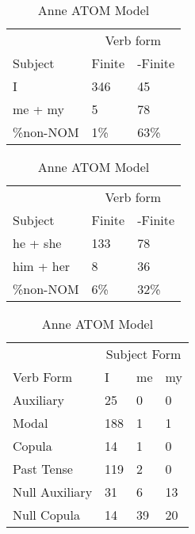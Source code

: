 \begin{table}[]
    \caption{Anne ATOM Model}
\begin{minipage}{0.5\textwidth}
    \centering
    \begin{tabular}{@{}lll@{}}
        \toprule
         &\multicolumn{2}{c}{Verb form}\\
         \cline{2-3}
        Subject & Finite & -Finite \\
        \midrule
        I & 346 & 45 \\
        me + my & 5 & 78 \\
        \hline
        \%non-NOM & 1\% & 63\% \\
        \bottomrule
    \end{tabular}
\end{minipage}
\begin{minipage}{0.5\textwidth}
    \centering
    \begin{tabular}{@{}lll@{}}
        \toprule
         &\multicolumn{2}{c}{Verb form}\\
         \cline{2-3}
        Subject & Finite & -Finite \\
        \midrule
        he + she & 133 & 78 \\
        him + her & 8 & 36 \\
        \hline
        \%non-NOM & 6\% & 32\% \\
        \bottomrule
    \end{tabular}
    \end{minipage}
\begin{minipage}{0.5\textwidth}
        \centering
    \begin{tabular}{@{}llll@{}}
        \toprule
            &\multicolumn{3}{c}{Subject Form}\\
            \cline{2-4}
        Verb Form & I & me & my \\
        \midrule
        Auxiliary & 25 & 0 & 0 \\
        Modal & 188 & 1 & 1 \\
        Copula & 14 & 1 & 0 \\
        Past Tense & 119 & 2 & 0 \\
        \hline
        Null Auxiliary & 31 & 6 & 13 \\
        Null Copula & 14 & 39 & 20 \\
        \bottomrule
    \end{tabular}

\end{minipage}
\end{table}
